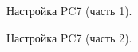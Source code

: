 \documentclass[a4paper,14pt]{article}
\begin{document}
\begin{figure}[!h]
    \caption{Настройка PC7 (часть 1).}
    \label{fig:pc7}
\end{figure}
\newpage
\begin{figure}[!h]
    \caption{Настройка PC7 (часть 2).}
    \label{fig:pc7_2}
\end{figure}
\end{document}
